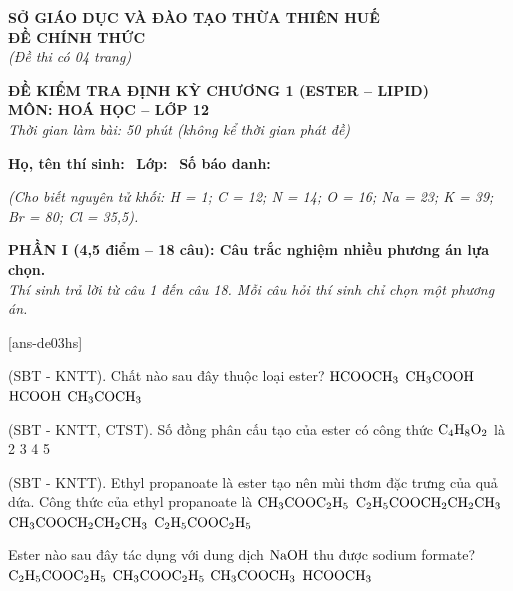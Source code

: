 \documentclass[12pt,a4paper]{article}
\begin{document}
\thispagestyle{firstpage}

\noindent
\begin{minipage}[t]{0.44\textwidth}
	\centering\fontsize{10pt}{12pt}\selectfont
	\textbf{SỞ GIÁO DỤC VÀ ĐÀO TẠO THỪA THIÊN HUẾ}\\
	\textbf{ĐỀ CHÍNH THỨC}\\
	\textit{(Đề thi có 04 trang)}
\end{minipage}\hfill
\begin{minipage}[t]{0.54\textwidth}
	\centering\small
	\textbf{ĐỀ KIỂM TRA ĐỊNH KỲ CHƯƠNG 1 (ESTER -- LIPID)}\\
	\textbf{MÔN: HOÁ HỌC -- LỚP 12}\\
	\textit{Thời gian làm bài: 50 phút (không kể thời gian phát đề)}\\
\end{minipage}

\smallskip
\noindent\hrulefill
\smallskip

\noindent\textbf{Họ, tên thí sinh:} \dotfill\ \textbf{Lớp:} \dotfill\ \textbf{Số báo danh:} \dotfill

\smallskip
\noindent\textit{(Cho biết nguyên tử khối: H = 1; C = 12; N = 14; O = 16; Na = 23; K = 39; Br = 80; Cl = 35,5).}
\smallskip

\noindent
\textbf{PHẦN I (4,5 điểm -- 18 câu): Câu trắc nghiệm nhiều phương án lựa chọn.}\\
\textit{Thí sinh trả lời từ câu 1 đến câu 18. Mỗi câu hỏi thí sinh chỉ chọn một phương án.}

[ans-de03hs]

\begin{ex}
(SBT - KNTT). Chất nào sau đây thuộc loại ester?
\choice
{$\ce{HCOOCH3}$}
{$\ce{CH3COOH}$}
{$\ce{HCOOH}$}
{$\ce{CH3COCH3}$}
\loigiai{}
\end{ex}

\begin{ex}
(SBT - KNTT, CTST). Số đồng phân cấu tạo của ester có công thức $\ce{C4H8O2}$ là
\choice
{2}
{3}
{4}
{5}
\loigiai{}
\end{ex}

\begin{ex}
(SBT - KNTT). Ethyl propanoate là ester tạo nên mùi thơm đặc trưng của quả dứa. Công thức của ethyl propanoate là
\choice
{$\ce{CH3COOC2H5}$}
{$\ce{C2H5COOCH2CH2CH3}$}
{$\ce{CH3COOCH2CH2CH3}$}
{$\ce{C2H5COOC2H5}$}
\loigiai{}
\end{ex}

\begin{ex}
Ester nào sau đây tác dụng với dung dịch $\ce{NaOH}$ thu được sodium formate?
\choice
{$\ce{C2H5COOC2H5}$}
{$\ce{CH3COOC2H5}$}
{$\ce{CH3COOCH3}$}
{$\ce{HCOOCH3}$}
\loigiai{}
\end{ex}
\end{document}
